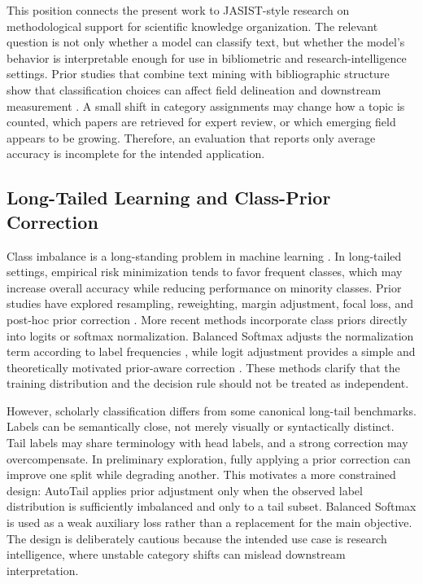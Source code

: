 \documentclass[10pt]{article}
\begin{document}
This position connects the present work to JASIST-style research on methodological support for scientific knowledge organization. The relevant question is not only whether a model can classify text, but whether the model's behavior is interpretable enough for use in bibliometric and research-intelligence settings. Prior studies that combine text mining with bibliographic structure show that classification choices can affect field delineation and downstream measurement \citep{waltman2012new,boyack2014characterizing}. A small shift in category assignments may change how a topic is counted, which papers are retrieved for expert review, or which emerging field appears to be growing. Therefore, an evaluation that reports only average accuracy is incomplete for the intended application.

\subsection{Long-Tailed Learning and Class-Prior Correction}

Class imbalance is a long-standing problem in machine learning \citep{he2009learning}. In long-tailed settings, empirical risk minimization tends to favor frequent classes, which may increase overall accuracy while reducing performance on minority classes. Prior studies have explored resampling, reweighting, margin adjustment, focal loss, and post-hoc prior correction \citep{lin2017focal,cao2019ldam,buda2018systematic}. More recent methods incorporate class priors directly into logits or softmax normalization. Balanced Softmax adjusts the normalization term according to label frequencies \citep{ren2020balanced}, while logit adjustment provides a simple and theoretically motivated prior-aware correction \citep{menon2021logit}. These methods clarify that the training distribution and the decision rule should not be treated as independent.

However, scholarly classification differs from some canonical long-tail benchmarks. Labels can be semantically close, not merely visually or syntactically distinct. Tail labels may share terminology with head labels, and a strong correction may overcompensate. In preliminary exploration, fully applying a prior correction can improve one split while degrading another. This motivates a more constrained design: AutoTail applies prior adjustment only when the observed label distribution is sufficiently imbalanced and only to a tail subset. Balanced Softmax is used as a weak auxiliary loss rather than a replacement for the main objective. The design is deliberately cautious because the intended use case is research intelligence, where unstable category shifts can mislead downstream interpretation.
\end{document}
